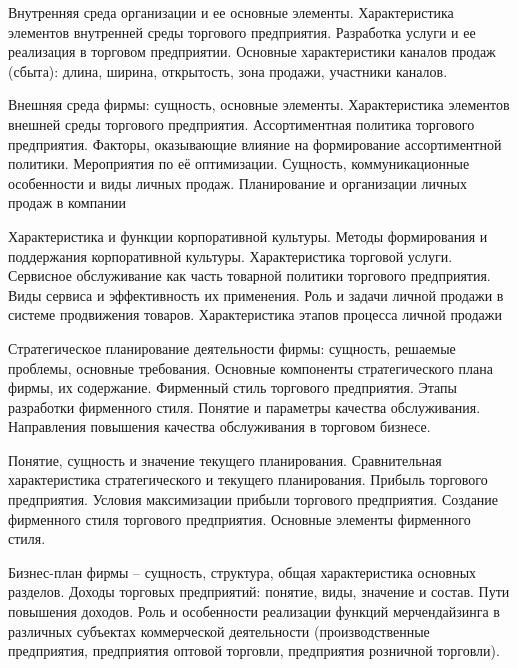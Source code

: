 \documentclass[
	11pt,
	a4paper,
	]
	{article}
\begin{document}
\bigskip

\noindent{} 
	{
		Внутренняя среда организации и ее основные элементы. Характеристика элементов внутренней среды торгового предприятия.
	}{
		Разработка услуги и ее реализация в торговом предприятии.
	}{
		Основные характеристики каналов продаж (сбыта): длина, ширина, открытость, зона продажи, участники каналов.
	}

\bigskip

\noindent{} 
	{
		Внешняя среда фирмы: сущность, основные элементы. Характеристика элементов внешней среды торгового предприятия.
	}{
		Ассортиментная политика торгового предприятия. Факторы, оказывающие влияние на формирование ассортиментной политики. Мероприятия по её оптимизации.
	}{
		Сущность, коммуникационные особенности и виды личных продаж. Планирование и организации личных продаж в компании
	}

\bigskip

\noindent{} 
	{
		Характеристика и функции корпоративной культуры. Методы формирования и поддержания корпоративной культуры.
	}{
		Характеристика торговой услуги. Сервисное обслуживание как часть товарной политики торгового предприятия. Виды сервиса и эффективность их применения.
	}{
		Роль и задачи личной продажи в системе продвижения товаров. Характеристика этапов процесса личной продажи
	}

\bigskip

\noindent{} 
	{
		Стратегическое планирование деятельности фирмы: сущность, решаемые проблемы, основные требования. Основные компоненты стратегического плана фирмы, их содержание.
	}{
		Фирменный стиль торгового предприятия. Этапы разработки фирменного стиля.
	}{
		Понятие и параметры качества обслуживания. Направления повышения качества обслуживания в торговом бизнесе.
	}

\bigskip

\noindent{} 
	{
		Понятие, сущность и значение текущего планирования. Сравнительная характеристика стратегического и текущего планирования.
	}{
		Прибыль торгового предприятия. Условия максимизации прибыли торгового предприятия.
	}{
		Создание фирменного стиля торгового предприятия. Основные элементы фирменного стиля.
	}

\bigskip

\noindent{} 
	{
		Бизнес-план фирмы – сущность, структура, общая характеристика основных разделов.
	}{
		Доходы торговых предприятий: понятие, виды, значение и состав. Пути повышения доходов.
	}{
		Роль и особенности реализации функций мерчендайзинга в различных субъектах коммерческой деятельности (производственные предприятия, предприятия оптовой торговли, предприятия розничной торговли).
	}
\end{document}
